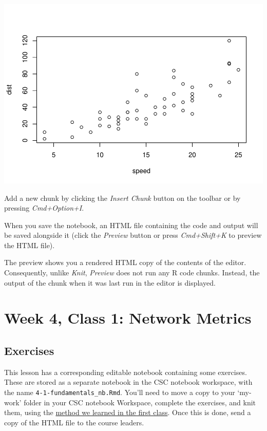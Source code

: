\documentclass[
]{book}
\begin{document}
\includegraphics{_main_files/figure-latex/unnamed-chunk-32-1.pdf}

Add a new chunk by clicking the \emph{Insert Chunk} button on the toolbar or by pressing \emph{Cmd+Option+I}.

When you save the notebook, an HTML file containing the code and output will be saved alongside it (click the \emph{Preview} button or press \emph{Cmd+Shift+K} to preview the HTML file).

The preview shows you a rendered HTML copy of the contents of the editor. Consequently, unlike \emph{Knit}, \emph{Preview} does not run any R code chunks. Instead, the output of the chunk when it was last run in the editor is displayed.

\hypertarget{week-4-class-1-network-metrics}{%
\chapter{Week 4, Class 1: Network Metrics}\label{week-4-class-1-network-metrics}}

\hypertarget{exercises-1}{%
\section{Exercises}\label{exercises-1}}

This lesson has a corresponding editable notebook containing some exercises. These are stored as a separate notebook in the CSC notebook workspace, with the name \texttt{4-1-fundamentals\_nb.Rmd}. You'll need to move a copy to your `my-work' folder in your CSC notebook Workspace, complete the exercises, and knit them, using the \href{https://comhis.github.io/applying-network-analysis-to-humanities/notebooks/1-1-introduction_nb.html}{method we learned in the first class}. Once this is done, send a copy of the HTML file to the course leaders.
\end{document}
